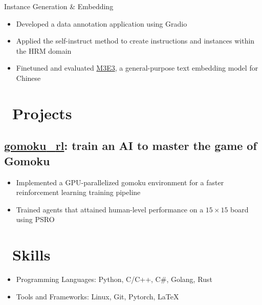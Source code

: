 \documentclass{resume}
\begin{document}
Instance Generation \& Embedding
\begin{itemize}
  \item Developed a data annotation application using Gradio
  \item Applied the self-instruct method to create instructions and instances within the HRM domain
  \item Finetuned and evaluated \href{https://huggingface.co/moka-ai/m3e-base}{M3E3}, a general-purpose text embedding model for Chinese
\end{itemize}

\section{\faRocket\ Projects}

\subsection{\faGithub\space\textbf{\href{https://github.com/hesic73/gomoku_rl}{gomoku{\_}rl}}: train an AI to master the game of Gomoku}

\begin{itemize}
  \item Implemented a GPU-parallelized gomoku environment for a faster reinforcement learning training pipeline
  \item Trained agents that attained human-level performance on a $15\times15$ board using PSRO
\end{itemize}


\section{\faCogs\ Skills}
\begin{itemize}[parsep=0.5ex]
  \item Programming Languages: Python, C/C++, C\#, Golang, Rust
  \item Tools and Frameworks: Linux, Git, Pytorch, \LaTeX
\end{itemize}



%
%
\end{document}
